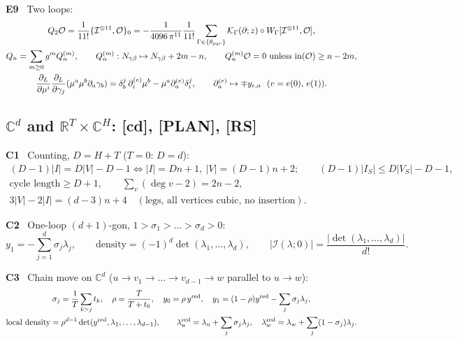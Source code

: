 \documentclass[10pt,a4paper]{article}
\numberwithin{equation}{section}
\newcommand{\cI}{\mathcal I}
\newcommand{\cK}{\mathcal K}
\newcommand{\cO}{\mathcal O}
\newcommand{\Sd}[1]{\textsf{6d}(#1)}
\newcommand{\Ed}[1]{\textsf{11d}(#1)}
\newcommand{\PL}[1]{\textsf{PLAN}\,\S#1}
\newcommand{\rid}[1]{\par\medskip\noindent\textbf{#1}\ }
\newcommand{\ptr}[2]{\par\nopagebreak{\footnotesize\raggedleft[\,#1\ $\mid$\ #2\,]\par}}
\newcommand{\st}[1]{\textsf{#1}}
\begin{document}
\rid{E9} Two loops:
\begin{gather*}
Q_2\cO=\frac1{11!}\{\cI^{\otimes11},\cO\}_0=-\frac1{4096\,\pi^{11}}\frac1{11!}\sum_{\Gamma\in\{\theta_{pqr}\}}\cK_\Gamma(\partial;z)\circ W_\Gamma[\cI^{\otimes11},\cO],\\
Q_n=\sum_{m\ge0}g^mQ_n^{(m)},\qquad Q_n^{(m)}:N_{\gamma\beta}\mapsto N_{\gamma\beta}+2m-n,\qquad Q_n^{(m)}\cO=0\ \text{unless}\ {\rm in}(\cO)\ge n-2m,\\
\frac{\partial_L}{\partial\mu^i}\frac{\partial_L}{\partial\gamma_j}(\mu^a\mu^b\partial_a\gamma_b)=\delta^j_b\,\partial^{(e)}_i\mu^b-\mu^a\partial^{(e)}_a\delta^j_i,\qquad\partial^{(e)}_a\mapsto\mp y_{e,a}\ \ (v=e(0),\,e(1)).
\end{gather*}
\ptr{\Ed{8.1}$=$\Ed{0.11}; Lemma 8.1 \Ed{8.2}; \Ed{8.3}}{\st{P}; not expanded into components (\textsf{11d} Status)}

\subsection{$\mathbb C^d$ and $\mathbb R^T\times\mathbb C^H$: \textsf{[cd]}, \textsf{[PLAN]}, \textsf{[RS]}}

\rid{C1} Counting, $D=H+T$ ($T=0$: $D=d$):
\begin{gather*}
(D-1)|I|=D|V|-D-1\iff|I|=Dn+1,\ |V|=(D-1)n+2;\qquad(D-1)|I_S|\le D|V_S|-D-1,\\
\text{cycle length}\ge D+1,\qquad\sum_v(\deg v-2)=2n-2,\\
3|V|-2|I|=(d-3)n+4\quad(\text{legs, all vertices cubic, no insertion}).
\end{gather*}
\ptr{\PL{3.1}, \PL{3.3}~E8, \PL{4}; \textsf{GKW} l.~636--643 ($n|\Gamma_0|=(n-1)|\Gamma_1|+n+1$, $n=H+T$); \Sd{5.11}, \Sd{5.12}; \Ed{0.4}}{\st{P} in \textsf{L}, \textsf{6d}, \textsf{11d} for $D=2,3,6$; general $D$: \textsf{GKW}; legs count: tagged [drv] in \textsf{PLAN}}

\rid{C2} One-loop $(d+1)$-gon, $1>\sigma_1>\dots>\sigma_d>0$:
\begin{equation*}
y_1=-\sum_{j=1}^d\sigma_j\lambda_j,\qquad\text{density}=(-1)^d\det(\lambda_1,\dots,\lambda_d),\qquad|\cI(\lambda;0)|=\frac{|\det(\lambda_1,\dots,\lambda_d)|}{d!}.
\end{equation*}
\ptr{\PL{3.1}; \path{check_cd.py}}{\st{C}, \st{R}: $d=2,3,4,5$ exact}

\rid{C3} Chain move on $\mathbb C^d$ ($u\to v_1\to\dots\to v_{d-1}\to w$ parallel to $u\to w$):
\begin{gather*}
\sigma_j=\frac1T\sum_{k>j}t_k,\quad\rho=\frac T{T+t_0},\quad y_0=\rho\,y^{\rm red},\quad y_1=(1-\rho)y^{\rm red}-\sum_j\sigma_j\lambda_j,\\
\text{local density}=\rho^{d-1}\det(y^{\rm red},\lambda_1,\dots,\lambda_{d-1}),\qquad\lambda_u^{\rm red}=\lambda_u+\sum_j\sigma_j\lambda_j,\quad\lambda_w^{\rm red}=\lambda_w+\sum_j(1-\sigma_j)\lambda_j .
\end{gather*}
\ptr{\PL{3.1}; \path{check_cd.py}}{\st{C}, \st{R}: pointwise with sign, $d=2,\dots,5$}
\end{document}
